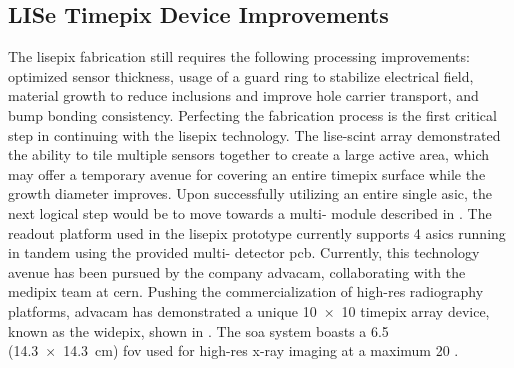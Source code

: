 \documentclass[../../../main.tex]{subfiles}
\begin{document}
%
    \subsection{LISe Timepix Device Improvements}%
    \label{sec:chapter-5:moving-forward:lise-timepix-device-improvements}%
    The \gls{lisepix} fabrication still requires the following processing improvements: optimized sensor thickness, usage of a guard ring to stabilize electrical field, material growth to reduce inclusions and improve hole carrier transport, and bump bonding consistency.
    Perfecting the fabrication process is the first critical step in continuing with the \gls{lisepix} technology.
    The \gls{lise-scint} array demonstrated the ability to tile multiple sensors together to create a large active area, which may offer a temporary avenue for covering an entire \gls{timepix} surface while the growth diameter improves.
    Upon successfully utilizing an entire single \gls{asic}, the next logical step would be to move towards a multi- module described in .
    The readout platform used in the \gls{lisepix} prototype currently supports \num{4} \glspl{asic} running in tandem using the provided multi- detector \gls{pcb}.
    Currently, this technology avenue has been pursued by the company \gls{advacam}, collaborating with the \gls{medipix} team at \gls{cern}.
    Pushing the commercialization of \gls{high-res} radiography platforms, \gls{advacam} has demonstrated a unique \num{10x10} \gls{timepix} array device, known as the \gls{widepix}, shown in .
    The \gls{soa} system boasts a \SI{6.5}{\mega\pixel} (\SI[product-units=power]{14.3x14.3}{\centi\meter}) \gls{fov} used for \gls{high-res} \gls{x-ray} imaging at a maximum \SI{20}{\framespersecond} \cite{Jakubek_2014}.
\end{document}
